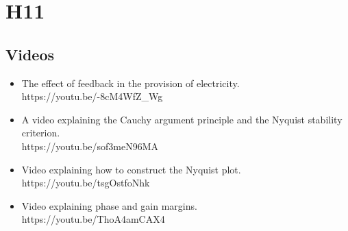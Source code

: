 \documentclass{document}
\begin{document}
	\section{H11}
	\subsection{Videos}
	\begin{itemize}
		\item The effect of feedback in the provision of electricity.\\ https://youtu.be/-8cM4WfZ_Wg
		\item A video explaining the Cauchy argument principle and the Nyquist stability criterion.\\
		https://youtu.be/sof3meN96MA
		\item Video explaining how to construct the Nyquist plot.\\ https://youtu.be/tsgOstfoNhk
		\item Video explaining phase and gain margins.\\
		https://youtu.be/ThoA4amCAX4
	\end{itemize}
\end{document}
